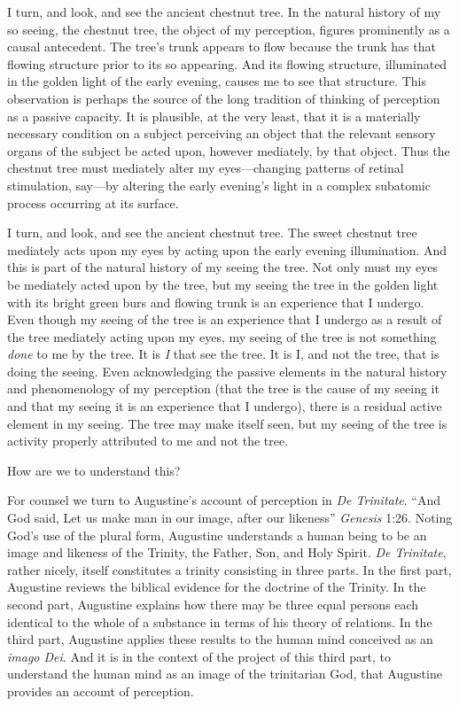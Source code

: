 \documentclass[12pt]{article}
\begin{document}
I turn, and look, and see the ancient chestnut tree. In the natural history of my so seeing, the chestnut tree, the object of my perception, figures prominently as a causal antecedent. The tree's trunk appears to flow because the trunk has that flowing structure prior to its so appearing. And its flowing structure, illuminated in the golden light of the early evening, causes me to see that structure. This observation is perhaps the source of the long tradition of thinking of perception as a passive capacity. It is plausible, at the very least, that it is a materially necessary condition on a subject perceiving an object that the relevant sensory organs of the subject be acted upon, however mediately, by that object. Thus the chestnut tree must mediately alter my eyes---changing patterns of retinal stimulation, say---by altering the early evening's light in a complex subatomic process occurring at its surface.

I turn, and look, and see the ancient chestnut tree. The sweet chestnut tree mediately acts upon my eyes by acting upon the early evening illumination. And this is part of the natural history of my seeing the tree. Not only must my eyes be mediately acted upon by the tree, but my seeing the tree in the golden light with its bright green burs and flowing trunk is an experience that I undergo. Even though my seeing of the tree is an experience that I undergo as a result of the tree mediately acting upon my eyes, my seeing of the tree is not something \emph{done} to me by the tree. It is \emph{I} that see the tree. It is I, and not the tree, that is doing the seeing. Even acknowledging the passive elements in the natural history and phenomenology of my perception (that the tree is the cause of my seeing it and that my seeing it is an experience that I undergo), there is a residual active element in my seeing. The tree may make itself seen, but my seeing of the tree is activity properly attributed to me and not the tree.

How are we to understand this?

For counsel we turn to Augustine's account of perception in \emph{De Trinitate}. ``And God said, Let us make man in our image, after our likeness'' \emph{Genesis} 1:26. Noting God's use of the plural form, Augustine understands a human being to be an image and likeness of the Trinity, the Father, Son, and Holy Spirit. \emph{De Trinitate}, rather nicely, itself constitutes a trinity consisting in three parts. In the first part, Augustine reviews the biblical evidence for the doctrine of the Trinity. In the second part, Augustine explains how there may be three equal persons each identical to the whole of a substance in terms of his theory of relations. In the third part, Augustine applies these results to the human mind conceived as an \emph{imago Dei}. And it is in the context of the project of this third part, to understand the human mind as an image of the trinitarian God, that Augustine provides an account of perception.
\end{document}
